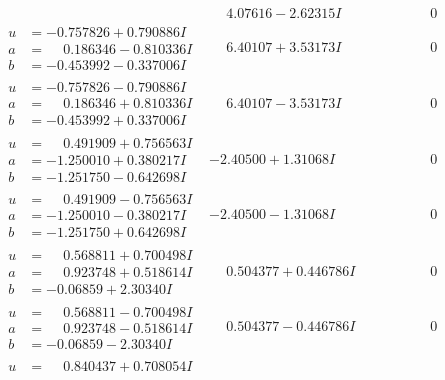 \documentclass[1p]{elsarticle_modified}
\theoremstyle{definition}
\begin{document}
$$\begin{array}{c|c|c}
 & \phantom{-}4.07616 - 2.62315 I & \phantom{-0.000000 } 0 \\ \hline\begin{aligned}
u &= -0.757826 + 0.790886 I \\
a &= \phantom{-}0.186346 - 0.810336 I \\
b &= -0.453992 - 0.337006 I\end{aligned}
 & \phantom{-}6.40107 + 3.53173 I & \phantom{-0.000000 } 0 \\ \hline\begin{aligned}
u &= -0.757826 - 0.790886 I \\
a &= \phantom{-}0.186346 + 0.810336 I \\
b &= -0.453992 + 0.337006 I\end{aligned}
 & \phantom{-}6.40107 - 3.53173 I & \phantom{-0.000000 } 0 \\ \hline\begin{aligned}
u &= \phantom{-}0.491909 + 0.756563 I \\
a &= -1.250010 + 0.380217 I \\
b &= -1.251750 - 0.642698 I\end{aligned}
 & -2.40500 + 1.31068 I & \phantom{-0.000000 } 0 \\ \hline\begin{aligned}
u &= \phantom{-}0.491909 - 0.756563 I \\
a &= -1.250010 - 0.380217 I \\
b &= -1.251750 + 0.642698 I\end{aligned}
 & -2.40500 - 1.31068 I & \phantom{-0.000000 } 0 \\ \hline\begin{aligned}
u &= \phantom{-}0.568811 + 0.700498 I \\
a &= \phantom{-}0.923748 + 0.518614 I \\
b &= -0.06859 + 2.30340 I\end{aligned}
 & \phantom{-}0.504377 + 0.446786 I & \phantom{-0.000000 } 0 \\ \hline\begin{aligned}
u &= \phantom{-}0.568811 - 0.700498 I \\
a &= \phantom{-}0.923748 - 0.518614 I \\
b &= -0.06859 - 2.30340 I\end{aligned}
 & \phantom{-}0.504377 - 0.446786 I & \phantom{-0.000000 } 0 \\ \hline\begin{aligned}
u &= \phantom{-}0.840437 + 0.708054 I \\

\end{aligned}
\end{array}$$
\end{document}
